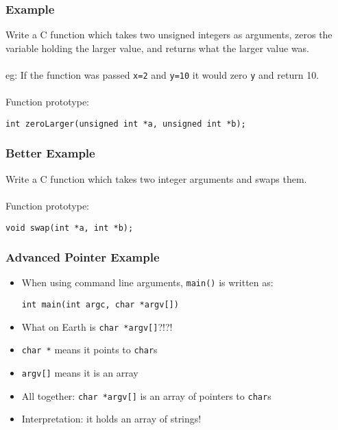 \documentclass[14pt]{beamer}
\begin{document}
\begin{frame}[fragile]
\frametitle{Example}
Write a C function which takes two unsigned integers as arguments, zeros the variable holding the larger value, and returns what the larger value was.
\\~\\
eg: If the function was passed \texttt{x=2} and \texttt{y=10} it would zero \texttt{y} and return 10.
\\~\\
Function prototype:
\begin{lstlisting}[style=CStyle]
int zeroLarger(unsigned int *a, unsigned int *b);
\end{lstlisting}
\end{frame}

\begin{frame}[fragile]
\frametitle{Better Example}
Write a C function which takes two integer arguments and swaps them.
\\~\\
Function prototype:
\begin{lstlisting}[style=CStyle]
void swap(int *a, int *b);
\end{lstlisting}
\end{frame}

\begin{frame}[fragile]
\frametitle{Advanced Pointer Example}
\begin{itemize}
\item When using command line arguments, \texttt{main()} is written as:
\begin{lstlisting}[style=CStyle]
int main(int argc, char *argv[])
\end{lstlisting}
\item What on Earth is \texttt{char *argv[]}?!?!
\pause
\item \texttt{char *} means it points to \texttt{char}s
\pause
\item \texttt{argv[]} means it is an array
\pause
\item All together: \texttt{char *argv[]} is an array of pointers to \texttt{char}s
\item Interpretation: it holds an array of strings!
\end{itemize}
\end{frame}
\end{document}
